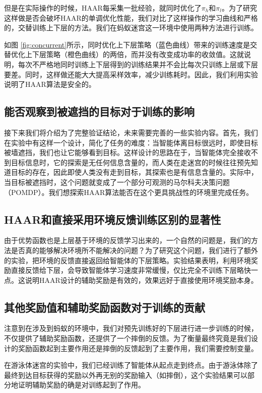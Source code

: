 但是在实际操作的时候，HAAR每采集一批经验，就同时优化了$\pi_h$和$\pi_l$。为了研究这样做是否会破坏HAAR的单调优化性能，我们对比了这样操作的学习曲线和严格的，交替训练上下层的方法。我们在蚂蚁迷宫这一环境中使用两种方法进行训练。

如图 \ref{fig:concurrent}所示，同时优化上下层策略（蓝色曲线）带来的训练速度是交替优化上下层策略（橙色曲线）的两倍，而并没有改变成功率的收敛值。这就说明，每次不严格地同时训练上下层得到的训练结果并不会比每次只训练上层或下层要差。同时，这样做还能大大提高采样效率，减少训练耗时。因此，我们利用实验说明了HAAR算法是安全的。

\subsection{能否观察到被遮挡的目标对于训练的影响}
接下来我们将介绍为了完整验证结论，未来需要完善的一些实验内容。首先，我们在实验中有这样一个设计，简化了任务的难度：当智能体离目标很远时，即使目标被墙遮挡，我们也让它能够看到目标。这样设计的思路在于，当智能体完全接收不到目标信息时，它的探索是无任何信息含量的，而人类在走迷宫的时候往往预先知道目标的存在，因此即使人类没有走到目标，其探索也是有信息含量的。实际中，当目标被遮挡时，这个问题就变成了一个部分可观测的马尔科夫决策问题（POMDP）。我们想探索HAAR算法能否在这个更具挑战性的环境里完成任务。

\subsection{HAAR和直接采用环境反馈训练区别的显著性}
由于优势函数也是上层基于环境的反馈学习出来的，一个自然的问题是，我们的方法是否真的能够解决环境所不能解决的问题？为了研究这个问题，我们进行了额外的实验，把环境的反馈直接返回给智能体的下层策略。实验结果表明，利用环境奖励直接反馈给下层，会导致智能体学习速度非常缓慢，仅比完全不训练下层略快一点。这说明HAAR设计的辅助奖励是有效的，效果远好于直接使用环境奖励本身。

\subsection{其他奖励值和辅助奖励函数对于训练的贡献}
注意到在涉及到蚂蚁的环境中，我们对预先训练好的下层进行进一步训练的时候，不仅提供了辅助奖励函数，还提供了一个摔倒的反馈。为了衡量最终究竟是我们设计的奖励函数起到主要作用还是摔倒的反馈起到了主要作用，我们需要控制变量。

在游泳体迷宫的实验中，我们已经训练了智能体从起点走到终点。由于游泳体除了最终到达目标获得的奖励以外再无别的奖励输入（如摔倒），这个实验结果可以部分地证明辅助奖励的确是对训练起到了作用。

